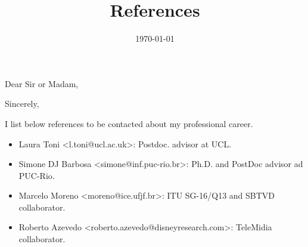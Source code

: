 \documentclass[10pt,a4paper,sans,colorlinks]{moderncv}
\title{References}
\begin{document}
\hfHyperrefSetupBlueLinks

\recipient{\ }{}
\opening{Dear Sir or Madam,}
\date{\today}
\closing{Sincerely,}

\makelettertitle

I list below references to be contacted about my professional career.

\begin{itemize}[nosep]
    \item Laura Toni <l.toni@ucl.ac.uk>: Postdoc. advisor at UCL.
    
    
    \item Simone DJ Barbosa <simone@inf.puc-rio.br>: Ph.D. and PostDoc advisor ad PUC-Rio.
    
    \item Marcelo Moreno <moreno@ice.ufjf.br>: ITU SG-16/Q13 and SBTVD collaborator. 
    
    \item Roberto Azevedo <roberto.azevedo@disneyresearch.com>: TeleMidia collaborator. 
    
    
    
  \end{itemize}

\makeletterclosing
\end{document}
